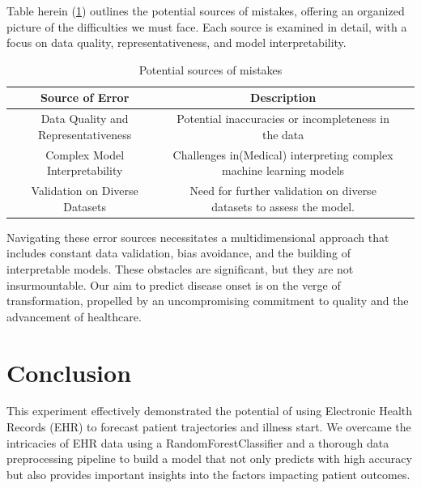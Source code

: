 \documentclass[manuscript,screen,]{acmart}
\begin{document}
Table herein (\ref{tab: Potential sources of mistakes}) outlines the potential sources of mistakes, offering an organized picture of the difficulties we must face. Each source is examined in detail, with a focus on data quality, representativeness, and model interpretability.

\begin{table}[h]
    \centering
    \begin{tabular}{|c|c|c|}
    \hline
    Source of Error & Description\\
    \hline
    Data Quality and Representativeness & Potential inaccuracies or incompleteness in the data\\
    \hline
    Complex Model Interpretability & Challenges in(Medical) interpreting complex machine learning models\\
    \hline
    Validation on Diverse Datasets & Need for further validation on diverse datasets to assess the model.\\
    \hline
    \end{tabular}
    \caption{Potential sources of mistakes}
    \label{tab: Potential sources of mistakes}
    
\end{table}

Navigating these error sources necessitates a multidimensional approach that includes constant data validation, bias avoidance, and the building of interpretable models. These obstacles are significant, but they are not insurmountable. Our aim to predict disease onset is on the verge of transformation, propelled by an uncompromising commitment to quality and the advancement of healthcare.

\section{Conclusion}
This experiment effectively demonstrated the potential of using Electronic Health Records (EHR) to forecast patient trajectories and illness start. We overcame the intricacies of EHR data using a RandomForestClassifier and a thorough data preprocessing pipeline to build a model that not only predicts with high accuracy but also provides important insights into the factors impacting patient outcomes.
\end{document}
